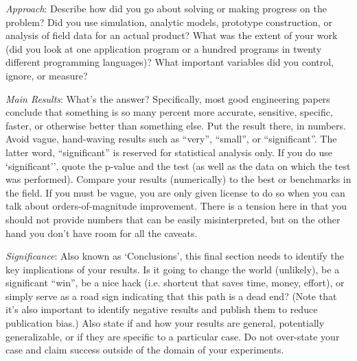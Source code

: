 {\it Approach}:
Describe how did you go about solving or making progress on the problem? Did you use simulation, analytic models, prototype construction, or analysis of field data for an actual product? What was the extent of your work (did you look at one application program or a hundred programs in twenty different programming languages)? What important variables did you control, ignore, or measure?

{\it Main Results}:
What's the answer? Specifically, most good engineering papers conclude that something is so many percent more accurate, sensitive, specific, faster, or otherwise better than something else. Put the result there, in numbers. Avoid vague, hand-waving results such as ``very'', ``small'', or ``significant''. The latter word, ``significant'' is reserved for statistical analysis only. If you do use  `significant'', quote the p-value and the test (as well as the data on which the test was performed). Compare your results (numerically) to the best or benchmarks in the field. If you must be vague, you are only given license to do so when you can talk about orders-of-magnitude improvement. There is a tension here in that you should not provide numbers that can be easily misinterpreted, but on the other hand you don't have room for all the caveats.

{\it Significance}: Also known as `Conclusions',
this final section needs to identify the key implications of your results. Is it going to change the world (unlikely), be a significant ``win'', be a nice hack (i.e. shortcut that saves time, money, effort), or simply serve as a road sign indicating that this path is a dead end? (Note that it's also important to identify negative results and publish them to reduce publication bias.) Also state if and how your results are general, potentially generalizable, or if they are specific to a particular case. Do not over-state your case and claim success outside of the domain of your experiments.


